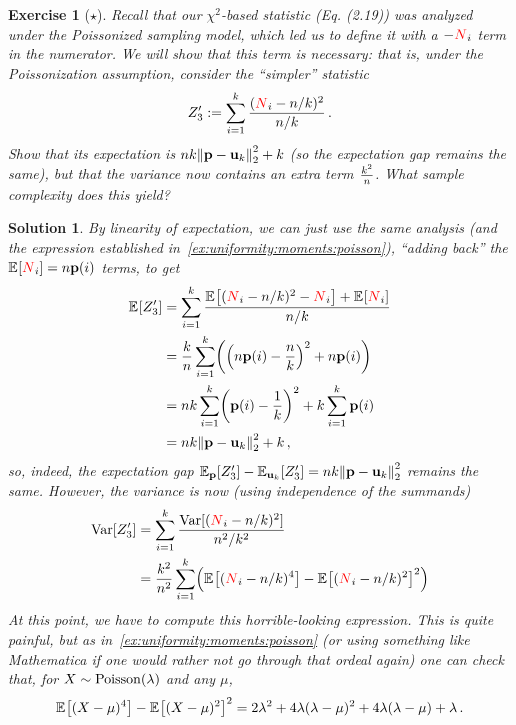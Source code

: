 \documentclass[biber]{nowfnt} %
\newtheorem{question}{Exercise}[chapter]
\newtheorem{solution}{Solution}[chapter]
\newcommand{\occur}{\textcolor{red}{N}}
\newcommand{\occur}{N}
\begin{document}
\begin{question}[$\star$]
  Recall that our $\chi^2$-based statistic (Eq. (2.19)) was analyzed under the Poissonized sampling model, which led us to define it with a $-\occur_i$ term in the numerator. We will show that this term is necessary: that is, under the Poissonization assumption, consider the ``simpler'' statistic
  \[
      Z'_3 \eqdef \sum_{i=1}^\ab \frac{(\occur_i-\ns/\ab)^2}{\ns/\ab}\,.
  \]
  Show that its expectation is $\ns\ab\normtwo{\p-\uniform_\ab}^2 +\ab$ (so the expectation \emph{gap} remains the same), but that the variance now contains an extra term $\frac{k^2}{n}$. What sample complexity does this yield?
\end{question}
\begin{solution}
By linearity of expectation, we can just use the same analysis (and the expression established in~\cref{ex:uniformity:moments:poisson}), ``adding back'' the $\bEE{\occur_i} = \ns\p(i)$ terms, to get
\begin{align*}
      \bEE{Z'_3} 
      &= \sum_{i=1}^\ab \frac{\bEE{(\occur_i-\ns/\ab)^2 - \occur_i} + \bEE{\occur_i}}{\ns/\ab} \\
      &= \frac{\ab}{\ns}\sum_{i=1}^\ab \Paren{\Paren{\ns\p(i)-\frac{\ns}{\ab}}^2 + \ns\p(i)} \\
      &= \ns\ab \sum_{i=1}^\ab \Paren{\p(i)-\frac{1}{\ab}}^2 + \ab \sum_{i=1}^\ab \p(i) \\
      &= \ns\ab\normtwo{\p-\uniform_\ab}^2 +\ab\,,
\end{align*}
so, indeed, the expectation gap $\bE{\p}{Z'_3} - \bE{\uniformOn{\ab}}{Z'_3} = \ns\ab\normtwo{\p-\uniform_\ab}^2$ remains the same. However, the variance is now (using independence of the summands)
\begin{align*}
      \Var[Z'_3] 
      &= \sum_{i=1}^\ab \frac{\Var[(\occur_i-\ns/\ab)^2]}{\ns^2/\ab^2} \\
      &= \frac{\ab^2}{\ns^2}\sum_{i=1}^\ab \Paren{\bEE{(\occur_i-\ns/\ab)^4} - \bEE{(\occur_i-\ns/\ab)^2}^2}
\end{align*}
At this point, we have to compute this horrible-looking expression. This is quite painful, but as in~\cref{ex:uniformity:moments:poisson} (or using something like Mathematica if one would rather not go through that ordeal again) one can check that, for $X\sim \poisson{\lambda}$ and any $\mu$,
\begin{equation}
	\bEE{(X-\mu)^4} - \bEE{(X-\mu)^2}^2 = 2\lambda^2 + 4\lambda(\lambda-\mu)^2 + 4\lambda(\lambda-\mu) + \lambda\,. 
\end{equation}

\end{solution}
\end{document}
